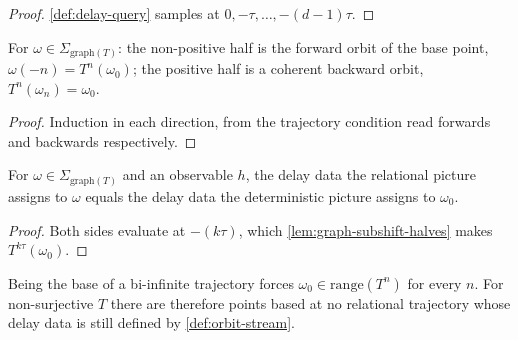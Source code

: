 \begin{proof}
  \leanok
  \ref{def:delay-query} samples at $0, -\tau, \dots, -(d-1)\tau$.
\end{proof}

\begin{lemma}
  \label{lem:graph-subshift-halves}
  \leanok
  For $\omega \in \Sigma_{\mathrm{graph}(T)}$: the non-positive half is the
  forward orbit of the base point, $\omega(-n) = T^n(\omega_0)$; the positive
  half is a coherent backward orbit, $T^n(\omega_n) = \omega_0$.
\end{lemma}

\begin{proof}
  \leanok
  Induction in each direction, from the trajectory condition read forwards and
  backwards respectively.
\end{proof}

\begin{theorem}
  \label{thm:deterministic-subclass}
  \leanok
  For $\omega \in \Sigma_{\mathrm{graph}(T)}$ and an observable $h$, the delay
  data the relational picture assigns to $\omega$ equals the delay data the
  deterministic picture assigns to $\omega_0$.
\end{theorem}

\begin{proof}
  \leanok
  Both sides evaluate at $-(k\tau)$, which \ref{lem:graph-subshift-halves} makes
  $T^{k\tau}(\omega_0)$.
\end{proof}

\begin{remark}
  \label{rmk:deterministic-residue}
  \leanok
  Being the base of a bi-infinite trajectory forces $\omega_0 \in
  \mathrm{range}(T^n)$ for every $n$. For non-surjective $T$ there are therefore
  points based at no relational trajectory whose delay data is still defined by
  \ref{def:orbit-stream}.
\end{remark}
